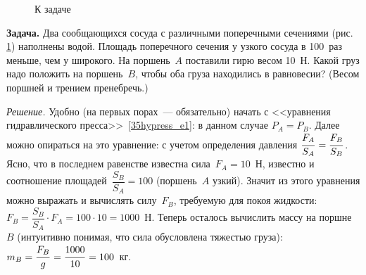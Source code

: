 \documentclass[main.tex]{subfiles}
\begin{document}
{%
\setlength\intextsep{0pt}
\begin{figure}
    \centering
    \caption{К задаче}
    \label{fig:p50}
\end{figure}

\noindent\textbf{Задача.} Два сообщающихся сосуда с различными поперечными сечениями (рис.\,\ref{fig:p50}) наполнены водой. Площадь поперечного сечения у узкого сосуда в 100~раз
меньше, чем у широкого. На поршень~$A$ поставили гирю
весом 10~Н. Какой груз надо положить на поршень~$B$,
чтобы оба груза находились в равновесии? (Весом поршней и трением пренебречь.)

}

\smallskip

\noindent\emph{Решение.} Удобно (на первых порах~--- обязательно) начать с <<уравнения гидравлического пресса>>~\eqref{35hypress_e1}: в данном случае $P_A=P_B$. Далее можно опираться на это уравнение: с учетом определения давления $\dfrac{F_A\strut}{S_A}=\dfrac{F_B\strut}{S_B}$. Ясно, что в последнем равенстве известна сила~$F_A=10$~Н, известно и соотношение площадей~$\dfrac{S_B}{S_A}=100$ (поршень~$A$ узкий). Значит из этого уравнения можно выражать и вычислять силу~$F_B$, требуемую для покоя жидкости: $F_B=\dfrac{S_B}{S_A}\cdot F_A=100\cdot 10=1000$~Н. Теперь осталось вычислить массу на поршне~$B$ (интуитивно понимая, что сила обусловлена тяжестью груза): $m_B=\dfrac{F_B\strut}{g}=\dfrac{1000\strut}{10}=100$~кг.




 
\end{document}
